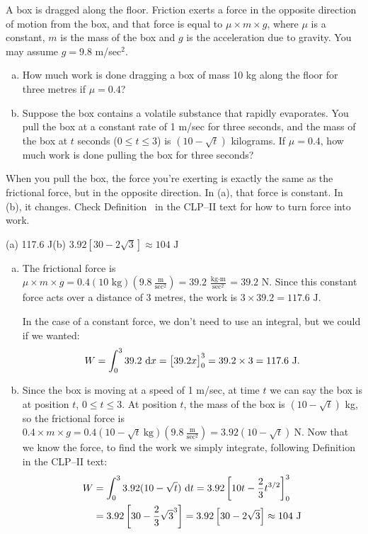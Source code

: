 \begin{question}
A box is dragged along the floor. Friction exerts a force in the opposite direction of motion from the box, and that force is equal to $\mu \times m \times g$, where $\mu$ is a constant, $m$ is the mass of the box and $g$ is the acceleration due to gravity. You may assume $g=9.8$ m/sec$^2$.

\begin{enumerate}[(a)]
\item How much work is done dragging a box of mass 10 kg along the floor for three metres if $\mu=0.4$?
\item Suppose the box contains a volatile substance that rapidly evaporates. You pull the box at a constant rate of 1 m/sec for three seconds, and the mass of the box at $t$ seconds ($0 \leq t \leq 3$) is $(10-\sqrt{t})$ kilograms. If $\mu=0.4$, how much work is done pulling the box for three seconds?
\end{enumerate}
\end{question}
\begin{hint}
When you pull the box, the force you're exerting is exactly the same as the frictional force, but in the opposite direction. In (a), that force is constant. In (b), it changes. Check Definition~ in the CLP--II text for how to turn force into work.
\end{hint}
\begin{answer}
(a) 117.6 J\qquad (b) $3.92\left[30-2\sqrt{3}\right]\approx 104\text{ J}$
\end{answer}
\begin{solution}
\begin{enumerate}[(a)]
\item The frictional force is $\mu \times m \times g = 0.4 \left(10 \text{ kg} \right)\left(9.8 \ \frac{\text{m}}{\text{sec}^2}\right)  = 39.2\ \frac{\text{kg}\cdot\text{m}}{\text{sec}^2} = 39.2\text { N}$. Since this constant force acts over a distance of 3 metres, the work is $3\times 39.2 =117.6 \text{ J} $.

 In the case of a constant force, we don't need to use an integral, but we could if we wanted:
 \[W = \int_0^3 39.2~\mathrm{d}x = \big[39.2x\big]_0^3 = 39.2 \times 3 = 117.6 \text{ J}.\]
\item Since the box is moving at a speed of 1 m/sec, at time $t$ we can say the box is at position $t$, $0 \le t \le 3$. At position $t$, the mass of the box is $(10-\sqrt{t})$ kg, so the frictional force is $0.4 \times m \times g = 0.4\left(10-\sqrt{t}~\text{kg}\right)\left(9.8~\frac{\text{m}}{\text{sec}^2}\right) = 3.92(10-\sqrt t) ~\text{N}$. Now that we know the force, to find the work we simply integrate, following Definition~ in the CLP--II text:
\begin{align*}
W &= \int_0^3 3.92(10-\sqrt t)\ \mathrm{d}t = 3.92\left[10t-\frac{2}{3}t^{3/2}\right]_0^3 \\
&=3.92\left[30-\frac{2}{3}\sqrt{3}^3\right]=3.92\left[30-2\sqrt{3}\right]\approx 104\text{ J}
\end{align*}
\end{enumerate}
\end{solution}

